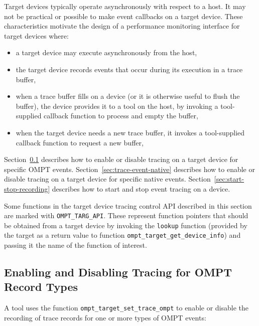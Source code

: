 \documentclass{article}
\begin{document}
Target devices typically operate asynchronously with respect to a host. It may not be practical or possible to make event callbacks on a target device. These characteristics motivate the design of a performance monitoring interface for target devices where: 
\begin{itemize}
\item a target device may execute asynchronously from the host,
\item the target device records events that occur during its execution in a trace buffer,
\item when a trace buffer fills on a device (or it is otherwise useful to flush the buffer),  the device provides it to a tool on the host, by invoking a tool-supplied callback function to process and empty the buffer,
\item when the target device needs a new trace buffer, it invokes a tool-supplied callback function to request a new buffer,
\end{itemize}


 Section~\ref{sec:trace-event}  describes how to enable or disable tracing on a target device for specific OMPT events. 
  Section~\ref{sec:trace-event-native}  describes how to enable or disable tracing on a target device for specific native events. Section~\ref{sec:start-stop-recording} describes how to start and stop event tracing on a device. 
  
Some functions in the target device tracing control API described in this section are marked with \verb|OMPT_TARG_API|. These represent function pointers that should be obtained from a target device by invoking the \verb|lookup| function (provided by the target  as a return value to function \verb|ompt_target_get_device_info|) and passing it the name of the function of interest.


\subsection{Enabling and Disabling Tracing for OMPT Record Types}
\label{sec:trace-event}
A tool uses the function \verb|ompt_target_set_trace_ompt| to enable or disable the recording of trace records for one or more types of OMPT events:
\end{document}
